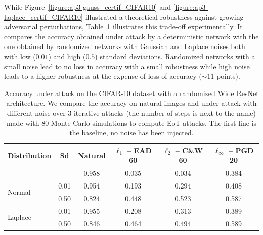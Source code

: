 While Figure~\ref{figure:ap3-gauss_certif_CIFAR10} and \ref{figure:ap3-laplace_certif_CIFAR10} illustrated a theoretical robustness against growing adversarial perturbations, Table~\ref{table:ap3-accuracy_under_attack} illustrates this trade-off experimentally.
It compares the accuracy obtained under attack by a deterministic network with the one obtained by randomized networks with Gaussian and Laplace noises both with low ($0.01$) and high ($0.5$) standard deviations.
Randomized networks with a small noise lead to no loss in accuracy with a small robustness while high noise leads to a higher robustness at the expense of loss of accuracy ($\sim11$ points). 

\begin{table}[t]
  \centering
  \caption{Accuracy under attack on the CIFAR-10 dataset with a randomized Wide ResNet architecture. We compare the accuracy on natural images and under attack with different noise over 3 iterative attacks (the number of steps is next to the name) made with 80 Monte Carlo simulations to compute EoT attacks. The first line is the baseline, no noise has been injected.}
    \begin{tabular}{lccccc}
    \toprule
    \textbf{Distribution} & \textbf{Sd} & \textbf{Natural} & \textbf{$\ell_1$ -- EAD 60} & \textbf{$\ell_2$ -- C\&W 60} & \textbf{$\ell_\infty$ -- PGD 20} \\
    \midrule
    - & - & 0.958 & 0.035 & 0.034 & 0.384 \\
    \midrule
    \multirow{2}[0]{*}{Normal} & 0.01 & 0.954 & 0.193 & 0.294 & 0.408 \\
          & 0.50 & 0.824 & 0.448 & 0.523 & 0.587 \\
    \midrule
    \multirow{2}[0]{*}{Laplace} & 0.01 & 0.955 & 0.208 & 0.313 & 0.389 \\
          & 0.50 & 0.846 & 0.464 & 0.494 & 0.589 \\
    \bottomrule
    \end{tabular}%
  \label{table:ap3-accuracy_under_attack}%
\end{table}%

